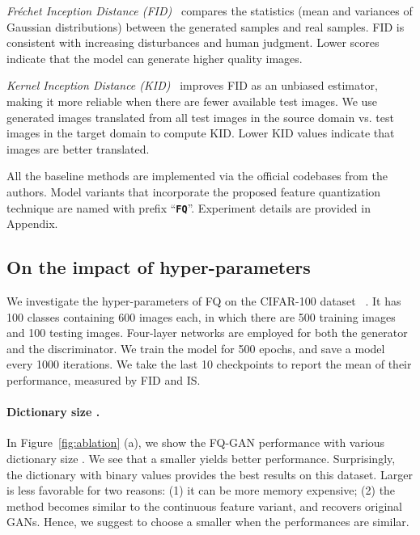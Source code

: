 \documentclass{article}
\begin{document}
    {\it Fréchet Inception Distance (FID)}~\citep{heusel2017gans} compares the statistics (mean and variances of Gaussian distributions) between the generated samples and real samples. FID is consistent with increasing disturbances and human judgment. Lower scores indicate that the model can generate higher quality images.
 
    {\it Kernel Inception Distance (KID)}~\citep{binkowski2018demystifying} improves FID as an unbiased estimator, making it more reliable when there are fewer available test images. We use generated images translated from all test images in the source domain vs. test images in the target domain to compute KID. Lower KID values indicate that images are better translated.


All the baseline methods are implemented via the official codebases from the authors. Model variants that incorporate the proposed feature quantization technique are named with prefix ``\textbf{\texttt{FQ}}''.  Experiment details are provided in Appendix.



\vspace{-2mm}
\subsection{On the impact of hyper-parameters}
We investigate the hyper-parameters of FQ on the CIFAR-100 dataset~\citep{krizhevsky2009learning} . It has 100 classes containing 600 images each, in which there are 500 training images and 100 testing images. Four-layer networks are employed for both the generator and the discriminator. We train the model for 500 epochs, and save a model every 1000 iterations.  We take the last 10 checkpoints to report the mean of their performance, measured by FID and IS.

\paragraph{Dictionary size .} In Figure~\ref{fig:ablation} (a), we show the FQ-GAN performance with various dictionary size . We see that a smaller  yields better performance. Surprisingly, the dictionary with binary values  provides the best results on this dataset. 
Larger  is less favorable for two reasons: (1) it can be more memory expensive; (2) the method becomes similar to the continuous feature variant, and  recovers original GANs.  Hence, we suggest to choose a smaller  when the performances are similar. 
\end{document}
